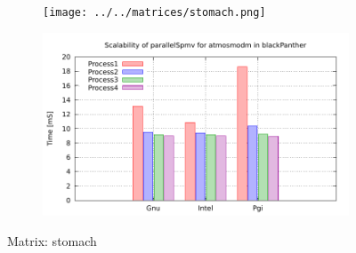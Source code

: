 \begin{figure} [ht!]
    \centering
    \captionsetup{justification=centering, singlelinecheck=false}
    \begin{subfigure}{.65\textwidth}
      \centering
      \hspace*{-3.5cm} 
      \texttt{[image: ../../matrices/stomach.png]}
      \label{fig:stomach_matrix}
    \end{subfigure}%
    \begin{subfigure}{.65\textwidth}
      \centering
      \hspace*{-6.0cm} 
      \includegraphics[page=9, width=0.95\linewidth]{../plots/blackPanther.pdf}
      \label{fig:stomach_performance}
    \end{subfigure}
\caption{Matrix: stomach}
\label{fig:stomach}
\end{figure}

